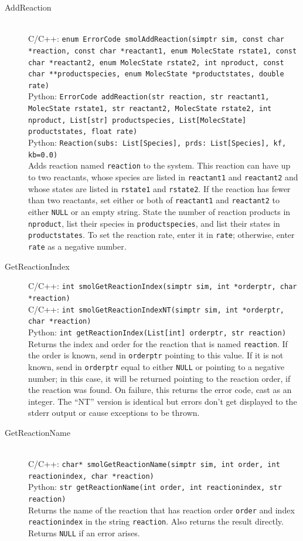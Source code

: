 \documentclass {book}
\newcommand {\ttt} {\texttt}
\begin{document}
\begin{description}

\item[AddReaction]
\hfill \\
C/C++: \ttt{enum ErrorCode smolAddReaction(simptr sim, const char *reaction, const char *reactant1, enum MolecState rstate1, const char *reactant2, enum MolecState rstate2, int nproduct, const char **productspecies, enum MolecState *productstates, double rate)}\\
Python: \ttt{ErrorCode addReaction(str reaction, str reactant1, MolecState rstate1, str reactant2, MolecState rstate2, int nproduct, List[str] productspecies, List[MolecState] productstates, float rate)}\\
Python: \ttt{Reaction(subs: List[Species], prds: List[Species], kf, kb=0.0)}\\
Adds reaction named \ttt{reaction} to the system. This reaction can have up to two reactants, whose species are listed in \ttt{reactant1} and \ttt{reactant2} and whose states are listed in \ttt{rstate1} and \ttt{rstate2}. If the reaction has fewer than two reactants, set either or both of \ttt{reactant1} and \ttt{reactant2} to either \ttt{NULL} or an empty string. State the number of reaction products in \ttt{nproduct}, list their species in \ttt{productspecies}, and list their states in \ttt{productstates}. To set the reaction rate, enter it in \ttt{rate}; otherwise, enter \ttt{rate} as a negative number.

\item[GetReactionIndex]
C/C++: \ttt{int smolGetReactionIndex(simptr sim, int *orderptr, char *reaction)}\\
C/C++: \ttt{int smolGetReactionIndexNT(simptr sim, int *orderptr, char *reaction)}\\
Python: \ttt{int getReactionIndex(List[int] orderptr, str reaction)}\\
Returns the index and order for the reaction that is named \ttt{reaction}. If the order is known, send in \ttt{orderptr} pointing to this value. If it is not known, send in \ttt{orderptr} equal to either \ttt{NULL} or pointing to a negative number; in this case, it will be returned pointing to the reaction order, if the reaction was found. On failure, this returns the error code, cast as an integer. The ``NT'' version is identical but errors don't get displayed to the stderr output or cause exceptions to be thrown.

\item[GetReactionName]
\hfill \\
C/C++: \ttt{char* smolGetReactionName(simptr sim, int order, int reactionindex, char *reaction)}\\
Python: \ttt{str getReactionName(int order, int reactionindex, str reaction)}\\
Returns the name of the reaction that has reaction order \ttt{order} and index \ttt{reactionindex} in the string \ttt{reaction}. Also returns the result directly. Returns \ttt{NULL} if an error arises.


\end{description}
\end{document}
